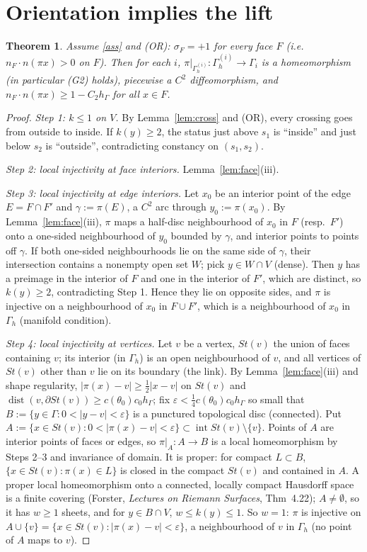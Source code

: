 \documentclass[11pt]{article}
\newtheorem{theorem}{Theorem}
\theoremstyle{definition}
\newcommand{\hG}{h_\Gamma}
\newcommand{\Gh}{\Gamma_h}
\DeclareMathOperator{\dist}{dist}
\begin{document}
\section{Orientation implies the lift}
\begin{theorem}\label{thm:orient}
Assume \ref{ass} and
\emph{(OR)}: $\sigma_F=+1$ for every face $F$ (i.e.\ $n_F\cdot n(\pi x)>0$ on $F$).
Then for each $i$, $\pi|_{\Gamma_h^{(i)}}:\Gamma_h^{(i)}\to\Gamma_i$ is a homeomorphism (in particular (G2) holds), piecewise a $C^2$ diffeomorphism, and $n_F\cdot n(\pi x)\ge1-C_2\hG$ for all $x\in F$.
\end{theorem}
\begin{proof}
\emph{Step 1: $k\le1$ on $V$.} By Lemma~\ref{lem:cross} and (OR), every crossing goes from outside to inside. If $k(y)\ge2$, the status just above $s_1$ is ``inside'' and just below $s_2$ is ``outside'', contradicting constancy on $(s_1,s_2)$.

\emph{Step 2: local injectivity at face interiors.} Lemma~\ref{lem:face}(iii).

\emph{Step 3: local injectivity at edge interiors.} Let $x_0$ be an interior point of the edge $E=F\cap F'$ and $\gamma:=\pi(E)$, a $C^2$ arc through $y_0:=\pi(x_0)$. By Lemma~\ref{lem:face}(iii), $\pi$ maps a half-disc neighbourhood of $x_0$ in $F$ (resp.\ $F'$) onto a one-sided neighbourhood of $y_0$ bounded by $\gamma$, and interior points to points off $\gamma$. If both one-sided neighbourhoods lie on the same side of $\gamma$, their intersection contains a nonempty open set $W$; pick $y\in W\cap V$ (dense). Then $y$ has a preimage in the interior of $F$ and one in the interior of $F'$, which are distinct, so $k(y)\ge2$, contradicting Step 1. Hence they lie on opposite sides, and $\pi$ is injective on a neighbourhood of $x_0$ in $F\cup F'$, which is a neighbourhood of $x_0$ in $\Gh$ (manifold condition).

\emph{Step 4: local injectivity at vertices.} Let $v$ be a vertex, $St(v)$ the union of faces containing $v$; its interior (in $\Gh$) is an open neighbourhood of $v$, and all vertices of $St(v)$ other than $v$ lie on its boundary (the link). By Lemma~\ref{lem:face}(iii) and shape regularity, $|\pi(x)-v|\ge\frac12|x-v|$ on $St(v)$ and $\dist(v,\partial St(v))\ge c(\theta_0)c_0\hG$; fix $\varepsilon<\frac14c(\theta_0)c_0\hG$ so small that $B:=\{y\in\Gamma:0<|y-v|<\varepsilon\}$ is a punctured topological disc (connected). Put $A:=\{x\in St(v):0<|\pi(x)-v|<\varepsilon\}\subset\operatorname{int}St(v)\setminus\{v\}$. Points of $A$ are interior points of faces or edges, so $\pi|_A:A\to B$ is a local homeomorphism by Steps 2--3 and invariance of domain. It is proper: for compact $L\subset B$, $\{x\in St(v):\pi(x)\in L\}$ is closed in the compact $St(v)$ and contained in $A$. A proper local homeomorphism onto a connected, locally compact Hausdorff space is a finite covering (Forster, \emph{Lectures on Riemann Surfaces}, Thm~4.22); $A\ne\emptyset$, so it has $w\ge1$ sheets, and for $y\in B\cap V$, $w\le k(y)\le1$. So $w=1$: $\pi$ is injective on $A\cup\{v\}=\{x\in St(v):|\pi(x)-v|<\varepsilon\}$, a neighbourhood of $v$ in $\Gh$ (no point of $A$ maps to $v$).


\end{proof}
\end{document}
